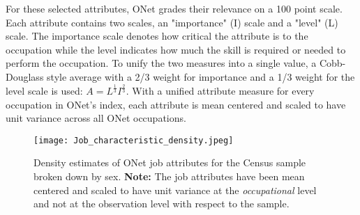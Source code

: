 \documentclass[12pt]{article}
\theoremstyle{definition}
\begin{document}
\bigskip

For these selected attributes, ONet grades their relevance on a
100 point scale. Each attribute contains two scales, an "importance" (I)
scale and a "level" (L) scale. The importance scale denotes how critical the
attribute is to the occupation while the level indicates how much the
skill is required or needed to perform the occupation. To unify the two
measures into a single value, a Cobb-Douglass style average with a
2/3 weight for importance and a 1/3 weight for the level scale is used:
$A = L^{\frac{1}{3}} I^{\frac{2}{3}}$. With a unified attribute measure
for every occupation in ONet's index, each attribute is mean centered and
scaled to have unit variance across all ONet occupations.


\begin{figure}[t!]
  \texttt{[image: Job\_characteristic\_density.jpeg]}
  \caption{Density estimates of ONet job attributes for the Census sample broken down by
  sex. \textbf{Note:} The job attributes have been mean centered and scaled to
  have unit variance at the \textit{occupational} level and not at the observation
  level with respect to the sample.}
  \label{fig:JobChar_vs_sex}
\end{figure}
\end{document}
